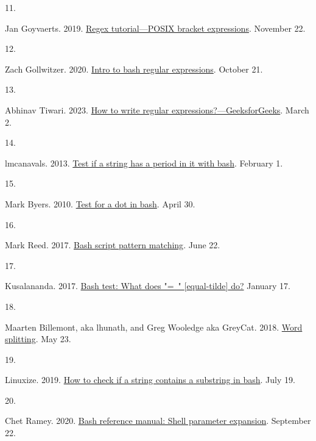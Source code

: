 \documentclass[
  a4paper,
]{article}
\newlength{\cslhangindent}
\newlength{\csllabelwidth}
\newlength{\cslentryspacingunit} %
\newenvironment{CSLReferences}[2] %
 {%
  \setlength{\parindent}{0pt}
  \ifodd #1
  \let\oldpar\par
  \def\par{\hangindent=\cslhangindent\oldpar}
  \fi
  \setlength{\parskip}{#2\cslentryspacingunit}
 }%
 {}
\newcommand{\CSLLeftMargin}[1]{\parbox[t]{\csllabelwidth}{#1}}
\newcommand{\CSLRightInline}[1]{\parbox[t]{\linewidth - \csllabelwidth}{#1}\break}
\begin{document}
\begin{CSLReferences}{0}{0}
\leavevmode{}%
\CSLLeftMargin{11. }%
\CSLRightInline{Jan Goyvaerts. 2019.
\href{https://www.regular-expressions.info/posixbrackets.html}{Regex
tutorial---POSIX bracket expressions}. November 22.}

\leavevmode{}%
\CSLLeftMargin{12. }%
\CSLRightInline{Zach Gollwitzer. 2020.
\href{https://dev.to/zachgoll/intro-to-bash-regular-expressions-4d2p}{Intro
to bash regular expressions}. October 21.}

\leavevmode{}%
\CSLLeftMargin{13. }%
\CSLRightInline{Abhinav Tiwari. 2023.
\href{https://www.geeksforgeeks.org/write-regular-expressions/}{How to
write regular expressions?---GeeksforGeeks}. March 2.}

\leavevmode{}%
\CSLLeftMargin{14. }%
\CSLRightInline{lmcanavals. 2013.
\href{https://unix.stackexchange.com/a/63374/11610}{Test if a string has
a period in it with bash}. February 1.}

\leavevmode{}%
\CSLLeftMargin{15. }%
\CSLRightInline{Mark Byers. 2010.
\href{https://stackoverflow.com/a/2745096}{Test for a dot in bash}.
April 30.}

\leavevmode{}%
\CSLLeftMargin{16. }%
\CSLRightInline{Mark Reed. 2017.
\href{https://stackoverflow.com/a/44688520}{Bash script pattern
matching}. June 22.}

\leavevmode{}%
\CSLLeftMargin{17. }%
\CSLRightInline{Kusalananda. 2017.
\href{https://unix.stackexchange.com/a/340485/11610}{Bash test: What
does "=~" {[}equal-tilde{]} do?} January 17.}

\leavevmode{}%
\CSLLeftMargin{18. }%
\CSLRightInline{Maarten Billemont, aka lhunath, and Greg Wooledge aka
GreyCat. 2018.
\href{https://mywiki.wooledge.org/WordSplitting?highlight=\%28spaces\%29\%7C\%28word\%29\%7C\%28splitting\%29}{Word
splitting}. May 23.}

\leavevmode{}%
\CSLLeftMargin{19. }%
\CSLRightInline{Linuxize. 2019.
\href{https://linuxize.com/post/how-to-check-if-string-contains-substring-in-bash/\#google_vignette}{How
to check if a string contains a substring in bash}. July 19.}

\leavevmode{}%
\CSLLeftMargin{20. }%
\CSLRightInline{Chet Ramey. 2020.
\href{https://www.gnu.org/savannah-checkouts/gnu/bash/manual/bash.html\#Shell-Parameter-Expansion}{Bash
reference manual: Shell parameter expansion}. September 22.}


\end{CSLReferences}
\end{document}
